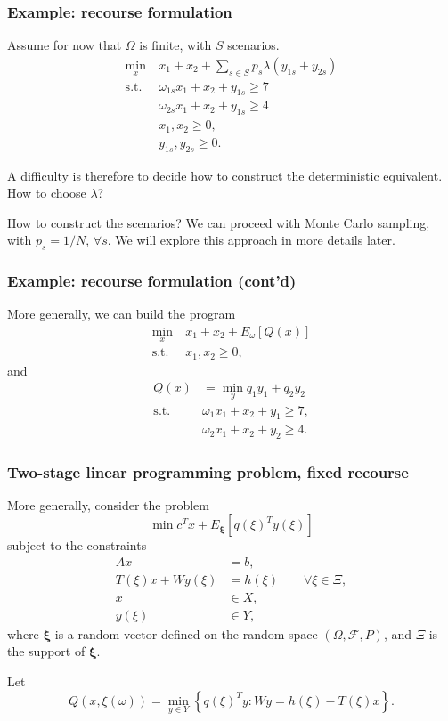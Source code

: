 \documentclass{beamer}
\def\bxi{\boldsymbol\xi}
\def\bxi{\boldsymbol\xi}
\begin{document}
\begin{frame}
	\frametitle{Example: recourse formulation}
	
	Assume for now that $\Omega$ is finite, with $S$ scenarios.
	\begin{align*}
	\min_x\ & x_1+x_2 + \sum_{s \in S} p_s \lambda (y_{1s} + y_{2s})\\
	\mbox{s.t. } & \omega_{1s}x_1 + x_2 + y_{1s} \geq 7 \\
	& \omega_{2s}x_1 + x_2 + y_{1s} \geq 4 \\
	& x_1, x_2 \geq 0,\\
	& y_{1s}, y_{2s} \geq 0.
	\end{align*}
	
	A difficulty is therefore to decide how to construct the deterministic equivalent.
	How to choose $\lambda$?
	
	\mbox{}
	
	How to construct the scenarios?
	We can proceed with Monte Carlo sampling, with $p_s = 1/N$, $\forall s$.
	We will explore this approach in more details later.
	
\end{frame}

\begin{frame}
	\frametitle{Example: recourse formulation (cont'd)}
	
	More generally, we can build the program
	\begin{align*}
	\min_x\ & x_1+x_2 + E_{\omega}[Q(x)] \\
	\mbox{s.t. } & x_1, x_2 \geq 0,
	\end{align*}
	and
	\begin{align*}
	Q(x) &= \min_y q_1y_1 + q_2y_2 \\
	\mbox{s.t. } & \omega_1 x_1 + x_2 + y_1 \geq 7, \\
	& \omega_2 x_1 + x_2 + y_2 \geq 4.
	\end{align*}
	
\end{frame}

\begin{frame}
\frametitle{Two-stage linear programming problem, fixed recourse}

More generally, consider the problem
\[
\min c^Tx + E_{\bxi}[q(\xi)^Ty(\xi)]
\]
subject to the constraints
\begin{align*}
Ax &= b, \\
T(\xi)x + Wy(\xi) &= h(\xi) \qquad \forall \xi \in \Xi, \\
x & \in X, \\
y(\xi) & \in Y,
\end{align*}
where $\bxi$ is a random vector defined on the random space 
$(\Omega, \mathcal{F}, P)$, and $\Xi$ is the support of $\bxi$.

\mbox{}

Let
\[
Q(x, \xi(\omega)) = \min_{y \in Y} \left\lbrace q(\xi)^Ty: Wy = h(\xi) - T(\xi)x \right\rbrace.
\]
\end{frame}
\end{document}
